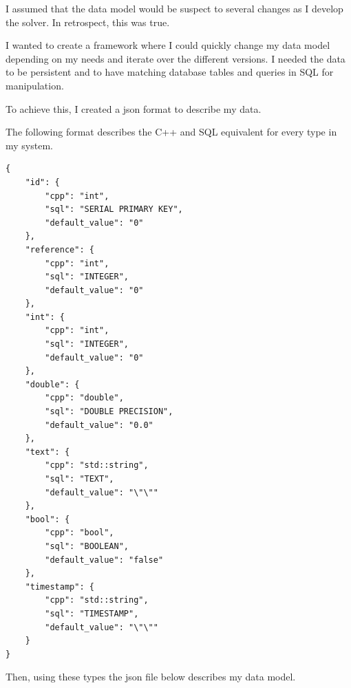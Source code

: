 I assumed that the data model would be suspect to several changes as I develop the solver. In retrospect, this was true.

I wanted to create a framework where I could quickly change my data model depending on my needs and iterate over the different versions. I needed the data to be persistent and to have matching database tables and queries in SQL for manipulation.

To achieve this, I created a json format to describe my data.

The following format describes the C++ and SQL equivalent for every type in my system.

\begin{lstlisting}
{
    "id": {
        "cpp": "int", 
        "sql": "SERIAL PRIMARY KEY",
        "default_value": "0"
    },
    "reference": {
        "cpp": "int",
        "sql": "INTEGER",
        "default_value": "0"
    },
    "int": {
        "cpp": "int",
        "sql": "INTEGER",
        "default_value": "0"
    },
    "double": {
        "cpp": "double",
        "sql": "DOUBLE PRECISION",
        "default_value": "0.0"
    },
    "text": {
        "cpp": "std::string",
        "sql": "TEXT",
        "default_value": "\"\""
    },
    "bool": {
        "cpp": "bool",
        "sql": "BOOLEAN",
        "default_value": "false"
    },
    "timestamp": {
        "cpp": "std::string",
        "sql": "TIMESTAMP",
        "default_value": "\"\"" 
    }
}
\end{lstlisting}

Then, using these types the json file below describes my data model.


